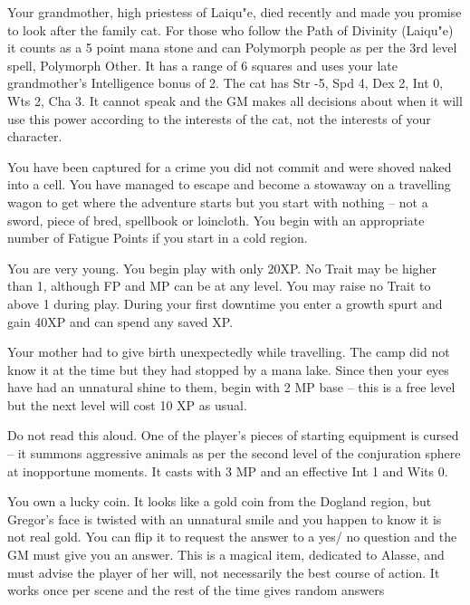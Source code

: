 \begin{list}{\addtocounter{list}{1}\textbf{:}}{\raggedleft}
\item{Your grandmother, high priestess of Laiqu"{e}, died recently and made you promise to look after the family cat.  For those who follow the Path of Divinity (Laiqu"{e}) it counts as a 5 point mana stone and can Polymorph people as per the 3rd level spell, Polymorph Other.  It has a range of 6 squares and uses your late grandmother's Intelligence bonus of 2.  The cat has Str -5, Spd 4, Dex 2, Int 0, Wts 2, Cha 3.  It cannot speak and the GM makes all decisions about when it will use this power according to the interests of the cat, not the interests of your character.}

\item{You have been captured for a crime you did not commit and were shoved naked into a cell.  You have managed to escape and become a stowaway on a travelling wagon to get where the adventure starts but you start with nothing -- not a sword, piece of bred, spellbook or loincloth.  You begin with an appropriate number of Fatigue Points if you start in a cold region.}

\item{ You are very young.  You begin play with only 20XP.  No Trait may be higher than 1, although FP and MP can be at any level.  You may raise no Trait to above 1 during play.  During your first downtime you enter a growth spurt and gain 40XP and can spend any saved XP. }

\item{ Your mother had to give birth unexpectedly while travelling.  The camp did not know it at the time but they had stopped by a mana lake.  Since then your eyes have had an unnatural shine to them, begin with 2 MP base -- this is a free level but the next level will cost 10 XP as usual. }

\item{ Do not read this aloud.  One of the player's pieces of starting equipment is cursed -- it summons aggressive animals as per the second level of the conjuration sphere at inopportune moments.  It casts with 3 MP and an effective Int 1 and Wits 0. }

\item{ You own a lucky coin.  It looks like a gold coin from the Dogland region, but Gregor's face is twisted with an unnatural smile and you happen to know it is not real gold.  You can flip it to request the answer to a yes/ no question and the GM must give you an answer. This is a magical item, dedicated to Alasse, and must advise the player of her will, not necessarily the best course of action.  It works once per scene and the rest of the time gives random answers }


\end{list}
